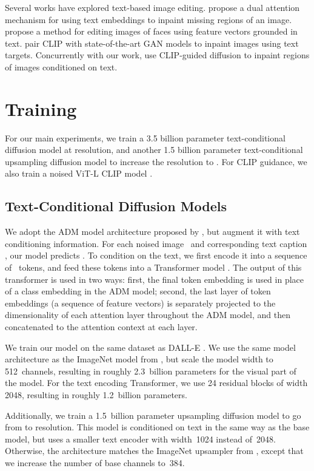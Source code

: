 \documentclass{article}
\begin{document}
Several works have explored text-based image editing. \citet{textinpainting} propose a dual attention mechanism for using text embeddings to inpaint missing regions of an image. \citet{textstylegan} propose a method for editing images of faces using feature vectors grounded in text. \citet{paintbyword} pair CLIP with state-of-the-art GAN models to inpaint images using text targets. Concurrently with our work, \citet{blendeddiff} use CLIP-guided diffusion to inpaint regions of images conditioned on text.

\section{Training}

For our main experiments, we train a 3.5 billion parameter text-conditional diffusion model at  resolution, and another 1.5 billion parameter text-conditional upsampling diffusion model to increase the resolution to . For CLIP guidance, we also train a noised  ViT-L CLIP model \citep{vit}.

\subsection{Text-Conditional Diffusion Models}

We adopt the ADM model architecture proposed by \citet{sotapaper}, but augment it with text conditioning information. For each noised image~ and corresponding text caption , our model predicts . To condition on the text, we first encode it into a sequence of~ tokens, and feed these tokens into a Transformer model \citep{transformer}. The output of this transformer is used in two ways: first, the final token embedding is used in place of a class embedding in the ADM model; second, the last layer of token embeddings (a sequence of  feature vectors) is separately projected to the dimensionality of each attention layer throughout the ADM model, and then concatenated to the attention context at each layer.

We train our model on the same dataset as DALL-E \citep{dalle}. We use the same model architecture as the ImageNet  model from \citet{sotapaper}, but scale the model width to 512~channels, resulting in roughly 2.3~billion parameters for the visual part of the model. For the text encoding Transformer, we use 24 residual blocks of width 2048, resulting in roughly 1.2~billion parameters.

Additionally, we train a 1.5~billion parameter upsampling diffusion model to go from  to  resolution. This model is conditioned on text in the same way as the base model, but uses a smaller text encoder with width~1024 instead of~2048. Otherwise, the architecture matches the ImageNet upsampler from \citet{sotapaper}, except that we increase the number of base channels to~384.
\end{document}
